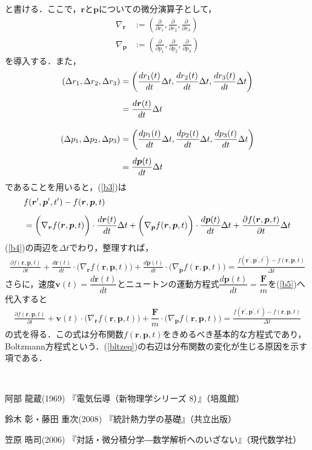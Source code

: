\documentclass[12pt]{jsarticle}\usepackage{ifthen}\newboolean{enlarge}\setboolean{enlarge}{false}
\newcommand{\vr}{{\bm{r}}} %
\newcommand{\vv}{{\bm{v}}} %
\newcommand{\vp}{{\bm{p}}} %
\begin{document}
と書ける．ここで，$\vr$と$\vp$についての微分演算子として，
　\begin{align}\label{nr}
　\nabla_{\vr}&:=
\left(
\frac{\partial }{\partial r_1}
,\frac{\partial }{\partial r_2}
,\frac{\partial }{\partial r_3}
\right)\\[5pt]
\label{np}
　\nabla_{\vp}&:=
\left(
\frac{\partial }{\partial p_1}
,\frac{\partial }{\partial p_2}
,\frac{\partial }{\partial p_3}
\right)
\end{align}
を導入する．また，
　　\begin{align}\label{dr}
(\Delta r_1,\Delta r_2,\Delta r_3)
&=\left(
\dfrac{dr_1(t)}{dt}\Delta t,\dfrac{dr_2(t)}{dt}\Delta t,\dfrac{dr_3(t)}{dt}\Delta t
\right)\notag\\[5pt]
&=\frac{d\vr(t)}{dt}\Delta t
\\[10pt]
%
\label{dp}
\left(\Delta p_1,\Delta p_2,\Delta p_3\right)
&=\left(
\dfrac{dp_1(t)}{dt}\Delta t,\dfrac{dp_2(t)}{dt}\Delta t,\dfrac{dp_3(t)}{dt}\Delta t
\right)\notag\\[5pt]
&=\frac{d\vp(t)}{dt}\Delta t
\end{align}
であることを用いると，(\ref{b3})は
　　\begin{align}\label{b4}
&f(\vr^\prime,\vp^\prime,t^\prime)-f(\vr,\vp,t)\notag\\[5pt]
&=
\biggl(
\nabla_{\vr}f(\vr,\vp,t)
\biggr)
\cdot
\frac{d\vr(t)}{dt}\Delta t
%
+
\biggl(
\nabla_{\vp}f(\vr,\vp,t)
\biggr)
\cdot
\frac{d\vp(t)}{dt}\Delta t
+
\frac{\partial f(\vr,\vp,t)}{\partial t}\Delta t
\end{align}
(\ref{b4})の両辺を$\Delta t$でわり，整理すれば，
%
\footnotesize
\begin{align}\label{b5}
\frac{\partial f(\vr,\vp,t)}{\partial t}
+
\frac{d\vr(t)}{dt}
\cdot
\biggl(
\nabla_{\vr}f(\vr,\vp,t)
\biggr)
%
+
\frac{d\vp(t)}{dt}
\cdot
\biggl(
\nabla_{\vp}f(\vr,\vp,t)
\biggr)
%
=
\frac
{f(\vr^\prime,\vp^\prime,t^\prime)-f(\vr,\vp,t)}{\Delta t}
\end{align}
\normalsize
さらに，速度$\vv(t)=\dfrac{d\vr(t)}{dt}$とニュートンの運動方程式$\dfrac{d\vp(t)}{dt}=\dfrac{\bm{F}}{m}$を(\ref{b5})へ代入すると
\small
\begin{align}\label{bltzeq}
\frac{\partial f(\vr,\vp,t)}{\partial t}
+
\vv(t)
\cdot
\biggl(
\nabla_{\vr}f(\vr,\vp,t)
\biggr)
%
+
\dfrac{\bm{F}}{m}
\cdot
\biggl(
\nabla_{\vp}f(\vr,\vp,t)
\biggr)
%
=
\frac
{f(\vr^\prime,\vp^\prime,t^\prime)-f(\vr,\vp,t)}{\Delta t}
\end{align}
\normalsize
の式を得る．この式は分布関数$f(\vr,\vp,t)$をきめるべき基本的な方程式であり，Boltzmann方程式という．(\ref{bltzeq})の右辺は分布関数の変化が生じる原因を示す項である．
















　\begin{thebibliography}{99}

\item
{阿部 龍蔵(1969)
『電気伝導（新物理学シリーズ 8）』（培風館）}
\item
{鈴木 彰・藤田 重次(2008) 『統計熱力学の基礎』（共立出版）}
\item
{笠原 晧司(2006)
『対話・微分積分学―数学解析へのいざない』（現代数学社）}
\end{thebibliography}
\end{document}
